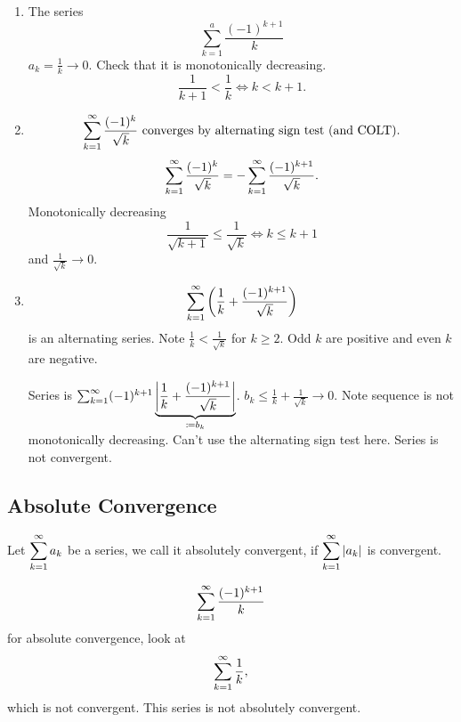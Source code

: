\documentclass[10pt, a4paper]{article}
\begin{document}
\begin{example}
    \begin{enumerate}[label = (\alph*)]
        \item The series
        \[
        \sum_{k = 1}^{a}\frac{(-1) ^ {k + 1}}{k}
        \]
        $a_k = \frac{1}{k} \to 0$.
        Check that it is monotonically decreasing.
        \[
        \frac{1}{k + 1} < \frac{1}{k} \iff k < k + 1.
        \]
        \item
        \[
        \infsum[k = 1]\frac{(-1) ^ k}{\sqrt{k}}\text{ converges by alternating sign test (and COLT)}.
        \]
        \[
        \infsum[k = 1]\frac{(-1) ^ k}{\sqrt{k}} = -\infsum[k = 1]\frac{(-1) ^ {k + 1}}{\sqrt{k}}.
        \]
        Monotonically decreasing
        \[
        \frac{1}{\sqrt{k + 1}} \leq \frac{1}{\sqrt{k}} \iff k \leq k + 1
        \]
        and $\frac{1}{\sqrt{k}} \to 0$.
        \item
        \[
        \infsum[k = 1]\left(\frac{1}{k} + \frac{(-1) ^ {k + 1}}{\sqrt{k}}\right)
        \]
        is an alternating series.
        Note $\frac{1}{k} < \frac{1}{\sqrt{k}}$ for $k \geq 2$.
        Odd $k$ are positive and even $k$ are negative.
        
        Series is $\infsum[k = 1](-1) ^ {k + 1}\underbrace{\left|\frac{1}{k} + \frac{(-1) ^ {k + 1}}{\sqrt{k}}\right|}_{\coloneqq b_k}$.
        $b_k \leq \frac{1}{k} + \frac{1}{\sqrt{k}} \to 0$.
        Note sequence is not monotonically decreasing.
        Can't use the alternating sign test here.
        Series is not convergent.
    \end{enumerate}
\end{example}

\subsection{Absolute Convergence}
\begin{definition}
    Let $\displaystyle\infsum[k = 1]a_k$ be a series,
    we call it absolutely convergent,
    if $\displaystyle\infsum[k = 1]|a_k|$ is convergent.
\end{definition}

\begin{example}
    \[
    \infsum[k = 1]\frac{(-1) ^ {k + 1}}{k}
    \]
    for absolute convergence,
    look at
    \[
    \infsum[k = 1]\frac{1}{k},
    \]
    which is not convergent.
    This series is not absolutely convergent.
\end{example}
\end{document}
